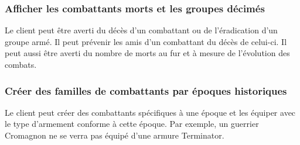 \subsubsection{Afficher les combattants morts et les groupes décimés}

Le client peut être averti du décès d'un combattant ou de l'éradication d'un groupe armé. Il peut prévenir les
amis d'un combattant du décès de celui-ci. Il peut aussi être averti du nombre de morts au fur et à mesure de
l'évolution des combats.

\subsubsection{Créer des familles de combattants par époques historiques}

Le client peut créer des combattants spécifiques à une époque et les équiper avec le type d'armement conforme
à cette époque. Par exemple, un guerrier Cromagnon ne se verra pas équipé d'une armure Terminator.